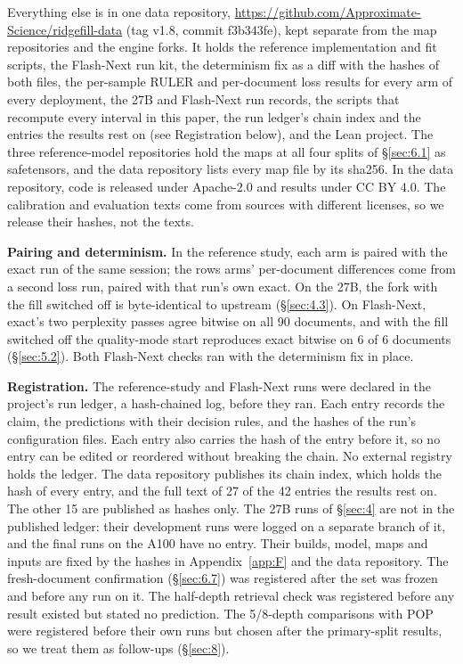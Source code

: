 \documentclass[11pt]{article}
\begin{document}
Everything else is in one data repository, \url{https://github.com/Approximate-Science/ridgefill-data} (tag v1.8, commit f3b343fe), kept separate from the map repositories and the engine forks. It holds the reference implementation and fit scripts, the Flash-Next run kit, the determinism fix as a diff with the hashes of both files, the per-sample RULER and per-document loss results for every arm of every deployment, the 27B and Flash-Next run records, the scripts that recompute every interval in this paper, the run ledger's chain index and the entries the results rest on (see Registration below), and the Lean project. The three reference-model repositories hold the maps at all four splits of \S\ref{sec:6.1} as safetensors, and the data repository lists every map file by its sha256. In the data repository, code is released under Apache-2.0 and results under CC BY 4.0. The calibration and evaluation texts come from sources with different licenses, so we release their hashes, not the texts.

\textbf{Pairing and determinism.} In the reference study, each arm is paired with the exact run of the same session; the rows arms' per-document differences come from a second loss run, paired with that run's own exact. On the 27B, the fork with the fill switched off is byte-identical to upstream (\S\ref{sec:4.3}). On Flash-Next, exact's two perplexity passes agree bitwise on all 90 documents, and with the fill switched off the quality-mode start reproduces exact bitwise on 6 of 6 documents (\S\ref{sec:5.2}). Both Flash-Next checks ran with the determinism fix in place.

\textbf{Registration.} The reference-study and Flash-Next runs were declared in the project's run ledger, a hash-chained log, before they ran. Each entry records the claim, the predictions with their decision rules, and the hashes of the run's configuration files. Each entry also carries the hash of the entry before it, so no entry can be edited or reordered without breaking the chain. No external registry holds the ledger. The data repository publishes its chain index, which holds the hash of every entry, and the full text of 27 of the 42 entries the results rest on. The other 15 are published as hashes only. The 27B runs of \S\ref{sec:4} are not in the published ledger: their development runs were logged on a separate branch of it, and the final runs on the A100 have no entry. Their builds, model, maps and inputs are fixed by the hashes in Appendix~\ref{app:F} and the data repository. The fresh-document confirmation (\S\ref{sec:6.7}) was registered after the set was frozen and before any run on it. The half-depth retrieval check was registered before any result existed but stated no prediction. The 5/8-depth comparisons with POP were registered before their own runs but chosen after the primary-split results, so we treat them as follow-ups (\S\ref{sec:8}).
\end{document}
